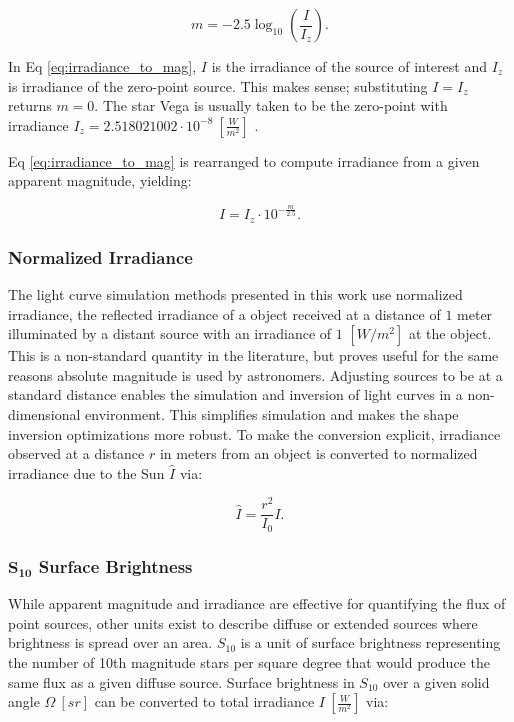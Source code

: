 \begin{equation} \label{eq:irradiance_to_mag}
  m = -2.5 \log_{10}\left( \frac{I}{I_z} \right).
\end{equation}

In Eq \ref{eq:irradiance_to_mag}, $I$ is the irradiance of the source of interest and $I_z$ is
irradiance of the zero-point source. This makes sense; substituting $I = I_z$ returns
$m=0$. The star Vega is usually taken to be the zero-point with irradiance $I_z = 2.518021002\cdot
10^{-8} \: \left[ \frac{W}{m^2} \right]$ \cite{frueh2019notes}.

Eq \ref{eq:irradiance_to_mag} is rearranged to compute irradiance from a given apparent magnitude,
yielding:

\begin{equation} \label{eq:mag_to_irradiance}
  I = I_z \cdot 10^{-\frac{m}{2.5}}.
\end{equation}

\subsubsection{Normalized Irradiance}

The light curve simulation methods presented in this work use normalized irradiance, 
the reflected irradiance of a object received at a distance of $1$ meter illuminated by a distant source with an irradiance of $1$ $\left[ W/m^2 \right]$ at the object. This is a non-standard quantity in the literature, but proves useful for the same reasons absolute magnitude is used by astronomers. Adjusting sources to be at a standard distance enables the simulation and inversion of light curves in a non-dimensional environment. This simplifies simulation and makes the shape inversion optimizations more robust. To make the conversion explicit, irradiance observed at a distance $r$ in meters from an object is converted to normalized irradiance due to the Sun $\hat{I}$ via:

\begin{equation} \label{eq:irradiance_to_norm_irradiance}
  \hat{I} = \frac{r^2}{I_0} I.
\end{equation}

\subsubsection{$\mathbf{S_{10}}$ Surface Brightness}

While apparent magnitude and irradiance are effective for quantifying the flux of point sources, other units exist
to describe diffuse or extended sources where brightness is spread over an
area. $S_{10}$ is a unit of surface brightness representing the number of 10th magnitude stars per square degree that would produce the same flux as a given diffuse source.
Surface brightness in $S_{10}$ over a given solid angle $\Omega \: \left[ sr \right]$ can be converted to total irradiance $I \: \left[ \frac{W}{m^2} \right]$ via:

